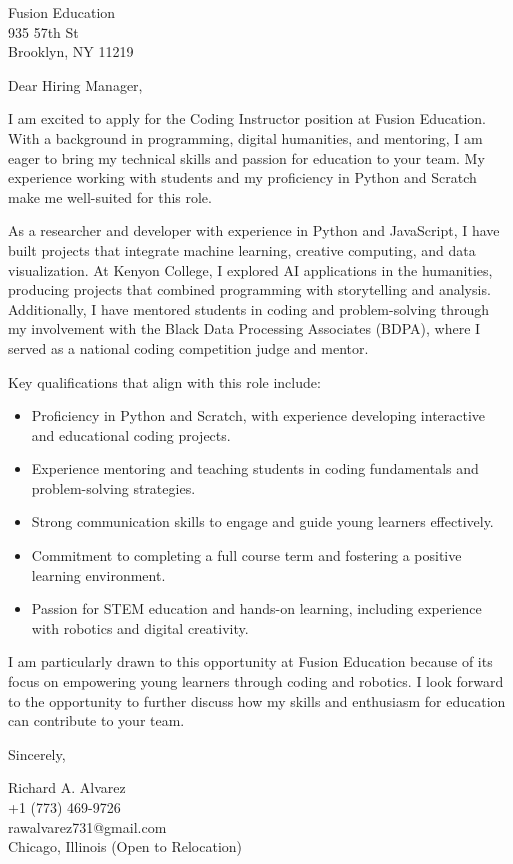 \documentclass[a4paper,10pt]{letter}
\begin{document}
\begin{letter}{
Fusion Education \\
935 57th St \\
Brooklyn, NY 11219}

\opening{Dear Hiring Manager,}

I am excited to apply for the Coding Instructor position at Fusion Education. With a background in programming, digital humanities, and mentoring, I am eager to bring my technical skills and passion for education to your team. My experience working with students and my proficiency in Python and Scratch make me well-suited for this role.

As a researcher and developer with experience in Python and JavaScript, I have built projects that integrate machine learning, creative computing, and data visualization. At Kenyon College, I explored AI applications in the humanities, producing projects that combined programming with storytelling and analysis. Additionally, I have mentored students in coding and problem-solving through my involvement with the Black Data Processing Associates (BDPA), where I served as a national coding competition judge and mentor.

Key qualifications that align with this role include:
\begin{itemize}
    \item Proficiency in Python and Scratch, with experience developing interactive and educational coding projects.
    \item Experience mentoring and teaching students in coding fundamentals and problem-solving strategies.
    \item Strong communication skills to engage and guide young learners effectively.
    \item Commitment to completing a full course term and fostering a positive learning environment.
    \item Passion for STEM education and hands-on learning, including experience with robotics and digital creativity.
\end{itemize}

I am particularly drawn to this opportunity at Fusion Education because of its focus on empowering young learners through coding and robotics. I look forward to the opportunity to further discuss how my skills and enthusiasm for education can contribute to your team.

\closing{Sincerely,}

Richard A. Alvarez \\
+1 (773) 469-9726 \\
rawalvarez731@gmail.com \\
Chicago, Illinois (Open to Relocation)

\end{letter}
\end{document}
